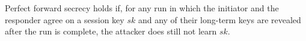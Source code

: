 Perfect forward
secrecy holds if, for any run in which the initiator and the responder
agree on a session key $sk$ and any of their long-term keys are revealed after
the run is complete, the attacker does still not learn $sk$.

 
%
% 

 
%

%

